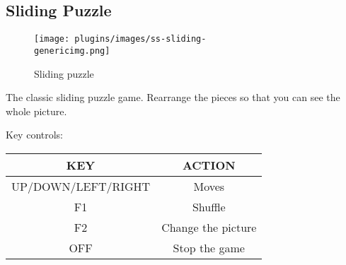 \subsection{Sliding Puzzle}
\begin{figure}[h!]
\begin{center}
\texttt{[image: plugins/images/ss-sliding-\\genericimg.png]}
\end{center}
\caption{Sliding puzzle}
\end{figure}

The classic sliding puzzle game.  Rearrange the pieces so that you can
see the whole picture.

Key controls:

\begin{table}[h!]
\begin{center}
\begin{tabular}{|c|c|}
\hline
KEY & ACTION \\\hline
UP/DOWN/LEFT/RIGHT & Moves \\\hline
F1 & Shuffle \\\hline
F2 & Change the picture \\\hline
OFF & Stop the game \\\hline
\end{tabular}
\end{center}
\end{table}
